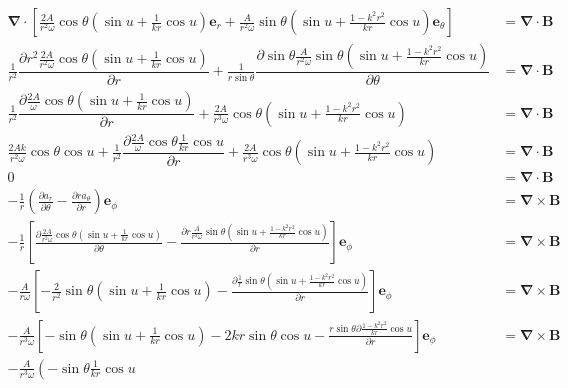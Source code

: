     \begin{align*}
    \boldsymbol{\nabla}\cdot\left[\frac{2A}{r^2\omega}\cos\theta\left(\sin u+\frac{1}{kr}\cos u\right)\boldsymbol{e}_r
    +\frac{A}{r^2\omega}\sin\theta\left(\sin u
    +\frac{1-k^2r^2}{kr}\cos u\right)
    \boldsymbol{e}_\theta\right]&=\boldsymbol{\nabla}\cdot\boldsymbol{B}\\
    \frac{1}{r^2}\dfrac{\partial r^2\frac{2A}{r^2\omega}\cos\theta\left(\sin u+\frac{1}{kr}\cos u\right)}{\partial r}
    +\frac{1}{r\sin\theta }\dfrac{\partial \sin\theta \frac{A}{r^2\omega}\sin\theta\left(\sin u
    +\frac{1-k^2r^2}{kr}\cos u\right)}{\partial \theta}&=\boldsymbol{\nabla}\cdot\boldsymbol{B}\\
    \frac{1}{r^2}\dfrac{\partial \frac{2A}{\omega}\cos\theta\left(\sin u+\frac{1}{kr}\cos u\right)}{\partial r}
    +\frac{2A}{r^3\omega}\cos\theta\left(\sin u
    +\frac{1-k^2r^2}{kr}\cos u\right)&=\boldsymbol{\nabla}\cdot\boldsymbol{B}\\
    \frac{2Ak}{r^2\omega}\cos\theta\cos u
    +\frac{1}{r^2}\dfrac{\partial \frac{2A}{\omega}\cos\theta\frac{1}{kr}\cos u}{\partial r}
    +\frac{2A}{r^3\omega}\cos\theta\left(\sin u
    +\frac{1-k^2r^2}{kr}\cos u\right)&=\boldsymbol{\nabla}\cdot\boldsymbol{B}\\
    0&=\boldsymbol{\nabla}\cdot\boldsymbol{B}\\
    -\frac{1}{r}\left(\frac{\partial a_r}{\partial \theta}
    -\frac{\partial ra_\theta}{\partial r}\right)\boldsymbol{e}_\phi
    &=\boldsymbol{\nabla}\times\boldsymbol{B}\\
    -\frac{1}{r}\left[\frac{\partial \frac{2A}{r^2\omega}\cos\theta\left(\sin u+\frac{1}{kr}\cos u\right)}{\partial \theta}
    -\frac{\partial r\frac{A}{r^2\omega}\sin\theta\left(\sin u
    +\frac{1-k^2r^2}{kr}\cos u\right)}{\partial r}\right]\boldsymbol{e}_\phi
    &=\boldsymbol{\nabla}\times\boldsymbol{B}\\
    -\frac{A}{r\omega}\left[-\frac{2}{r^2}\sin\theta\left(\sin u+\frac{1}{kr}\cos u\right)
    -\frac{\partial \frac{1}{r}\sin\theta\left(\sin u
    +\frac{1-k^2r^2}{kr}\cos u\right)}{\partial r}
    \right]\boldsymbol{e}_\phi
    &=\boldsymbol{\nabla}\times\boldsymbol{B}\\
    -\frac{A}{r^3\omega}\left[-\sin\theta\left(\sin u+\frac{1}{kr}\cos u\right)
    -2kr\sin\theta \cos u
    -\frac{r \sin\theta\partial\frac{1-k^2r^2}{kr}\cos u}{\partial r}
    \right]\boldsymbol{e}_\phi
    &=\boldsymbol{\nabla}\times\boldsymbol{B}\\
    -\frac{A}{r^3\omega}\left(-\sin\theta\frac{1}{kr}\cos u

\end{align*}
